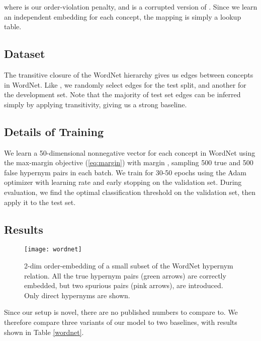 \documentclass{article} \usepackage{iclr2016_conference,times}
\begin{document}
where  is our order-violation penalty, and  is a corrupted version of . Since we learn an independent embedding for each concept, the mapping  is simply a lookup table.

\vspace{-0.5mm}
\subsection{Dataset}
\vspace{-0.5mm}

The transitive closure of the WordNet hierarchy gives us  edges between  concepts in WordNet. Like \citet{bordes2011learning}, we randomly select  edges for the test split, and another  for the development set. Note that the majority of test set edges can be inferred simply by applying transitivity, giving us a strong baseline. 

\vspace{-0.5mm}
\subsection{Details of Training}
\vspace{-0.5mm}

We learn a 50-dimensional nonnegative vector for each concept in WordNet using the max-margin objective (\ref{eq:margin}) with margin , sampling 500 true and 500 false hypernym pairs in each batch. We train for 30-50 epochs using the Adam optimizer \citep{adam} with learning rate  and early stopping on the validation set. 
During evaluation, we find the optimal classification threshold on the validation set, then apply it to the test set.


\subsection{Results}

\begin{wrapfigure}[18]{r}{0.40\textwidth}
	\vspace{-4mm}
	\centering
	\texttt{[image: wordnet]}
	\vspace{-6mm}
	\caption{\small 2-dim order-embedding of a small subset of the WordNet hypernym relation. All the true hypernym pairs (green arrows) are correctly embedded, but two spurious pairs (pink arrows), are introduced. Only direct hypernyms are shown. }
	\label{fig:wordnet}
\end{wrapfigure}

Since our setup is novel, there are no published numbers to compare to. We therefore compare three variants of our model to two baselines, with results shown in Table \ref{wordnet}.
\end{document}
